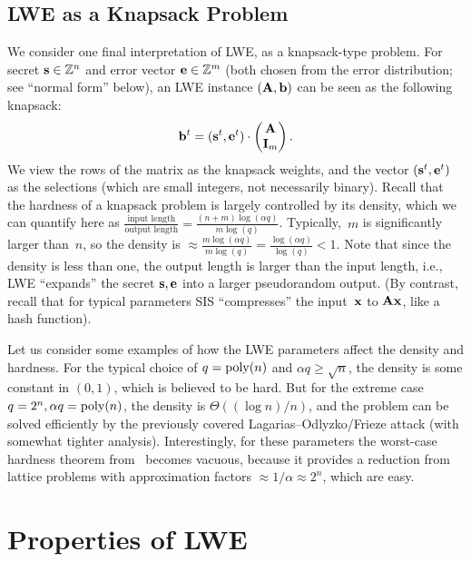 \documentclass[11pt]{article}
\begin{document}
\subsection{LWE as a Knapsack Problem}
\label{sec:lwe-as-knapsack}

We consider one final interpretation of LWE, as a knapsack-type
problem. For secret $\mathbf{s} \in \mathbb{Z}^n$ and error vector $\mathbf{e} \in \mathbb{Z}^m$
(both chosen from the error distribution; see ``normal form'' below),
an LWE instance $(\mathbf{A}, \mathbf{b})$ can be seen as the following
knapsack:
\begin{align*}
  \mathbf{b}^{t} = (\mathbf{s}^t,  \mathbf{e}^t) \cdot
  \begin{pmatrix}
    \mathbf{A} \\ \mathbf{I}_m
  \end{pmatrix} .
\end{align*}
We view the rows of the matrix as the knapsack weights, and the vector
$(\mathbf{s}^t, \mathbf{e}^t)$ as the selections (which are small integers, not
necessarily binary). Recall that the hardness of a knapsack problem is
largely controlled by its density, which we can quantify here as
$\frac{\text{input length}}{\text{output length}} =
\frac{(n+m)\log(\alpha q)}{m \log(q)}$. Typically,~$m$ is
significantly larger than~$n$, so the density is
$\approx \frac{m\log(\alpha q)}{m\log(q)} = \frac{\log(\alpha
  q)}{\log(q)} < 1$. Note that since the density is less than one, the
output length is larger than the input length, i.e., LWE ``expands''
the secret $\mathbf{s},\mathbf{e}$ into a larger pseudorandom output. (By
contrast, recall that for typical parameters SIS ``compresses'' the
input~$\mathbf{x}$ to $\mathbf{A} \mathbf{x}$, like a hash function).

Let us consider some examples of how the LWE parameters affect the
density and hardness. For the typical choice of $q = \operatorname{poly}(n)$ and
$\alpha q \geq \sqrt{n}$, the density is some constant in $(0,1)$,
which is believed to be hard. But for the extreme case
$q = 2^n, \alpha q = \operatorname{poly}(n)$, the density is $\Theta((\log n)/n)$,
and the problem can be solved efficiently by the previously covered
Lagarias--Odlyzko/Frieze attack (with somewhat tighter analysis).
Interestingly, for these parameters the worst-case hardness theorem
from~\cite{DBLP:journals/jacm/Regev09} becomes vacuous, because it
provides a reduction from lattice problems with approximation factors
$\approx 1/\alpha \approx 2^{n}$, which are easy.

\section{Properties of LWE}
\label{sec:properties}
\end{document}
